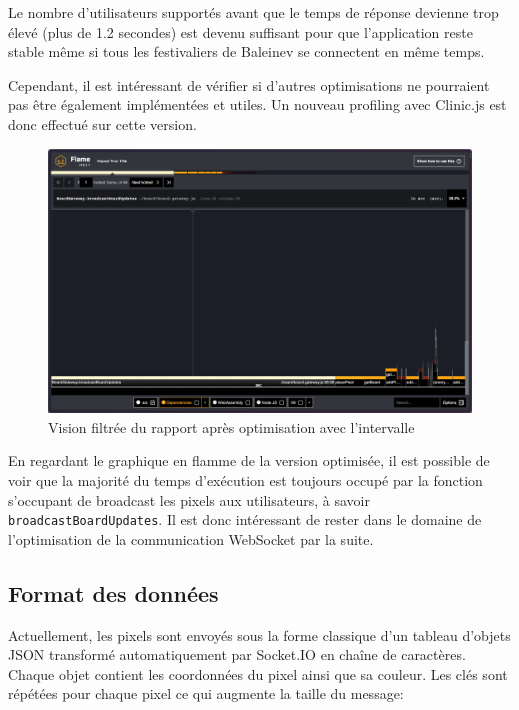 Le nombre d'utilisateurs supportés avant que le temps de réponse devienne trop élevé (plus de 1.2 secondes) est devenu suffisant pour que l'application reste stable même si tous les festivaliers de Baleinev se connectent en même temps.

Cependant, il est intéressant de vérifier si d'autres optimisations ne pourraient pas être également implémentées et utiles. Un nouveau profiling avec Clinic.js est donc effectué sur cette version.


\begin{figure}[H]
  \centering
  \includegraphics[width=1\textwidth]{./assets/figures/flame/flame2-filtered.png}
  \caption{Vision filtrée du rapport après optimisation avec l'intervalle}
  \label{fig:flame2-filtered}
\end{figure}

En regardant le graphique en flamme de la version optimisée, il est possible de voir que la majorité du temps d'exécution est toujours occupé par la fonction s'occupant de broadcast les pixels aux utilisateurs, à savoir \texttt{broadcastBoardUpdates}. Il est donc intéressant de rester dans le domaine de l'optimisation de la communication WebSocket par la suite.

\subsection{Format des données}

Actuellement, les pixels sont envoyés sous la forme classique d'un tableau d'objets JSON transformé automatiquement par Socket.IO en chaîne de caractères. Chaque objet contient les coordonnées du pixel ainsi que sa couleur. Les clés sont répétées pour chaque pixel ce qui augmente la taille du message:


